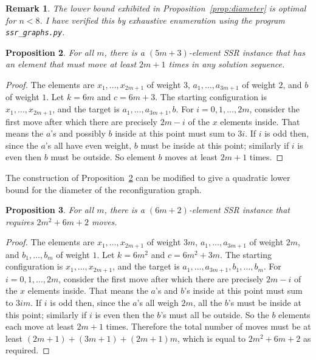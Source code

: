 \documentclass{robinminion}
\newtheorem{prop}{Proposition}
\newtheorem{rem}[prop]{Remark}
\begin{document}
\begin{rem}
    The lower bound exhibited in Proposition~\ref{prop:diameter} is optimal for $n<8$. I have verified this by exhaustive enumeration using the program \texttt{ssr\_graphs.py}.
\end{rem}

\begin{prop}\label{prop:element-moves-a-lot}
    For all $m$, there is a $(5m+3)$-element SSR instance that has an element that must move at least $2m+1$ times in any solution sequence.
\end{prop}
\begin{proof}
    The elements are $x_1, \dots, x_{2m+1}$ of weight $3$, $a_1, \dots, a_{3m+1}$ of weight $2$, and $b$ of weight $1$.
    Let $k=6m$ and $c=6m+3$. The starting configuration is $x_1, \dots, x_{2m+1}$, and the target is $a_1, \dots, a_{3m+1}, b$. For $i=0, 1, \dots, 2m$, consider the first move after which there are precisely $2m-i$ of the $x$ elements inside. That means the $a$'s and possibly $b$ inside at this point must sum to $3i$. If $i$ is odd then, since the $a$'s all have even weight, $b$ must be inside at this point; similarly if $i$ is even then $b$ must be outside. So element $b$ moves at least $2m+1$ times.
\end{proof}

\noindent The construction of Proposition~\ref{prop:element-moves-a-lot} can be modified to give a quadratic lower bound for the diameter of the reconfiguration graph.
\begin{prop}\label{prop:quadratic-bound}
    For all $m$, there is a $(6m+2)$-element SSR instance that requires $2m^2+6m+2$ moves.
\end{prop}
\begin{proof}
    The elements are
    $x_1, \dots, x_{2m+1}$ of weight $3m$,
    $a_1, \dots, a_{3m+1}$ of weight $2m$,
    and $b_1, \dots, b_m$ of weight $1$.
    Let $k=6m^2$ and $c=6m^2+3m$.
    The starting configuration is $x_1, \dots, x_{2m+1}$,
    and the target is $a_1, \dots, a_{3m+1}, b_1, \dots, b_m$.
    For $i=0, 1, \dots, 2m$, consider the first move after which there are precisely $2m-i$ of the $x$ elements inside. That means the $a$'s and $b$'s inside at this point must sum to $3im$. If $i$ is odd then, since the $a$'s all weigh $2m$, all the $b$'s must be inside at this point; similarly if $i$ is even then the $b$'s must all be outside. So the $b$ elements each move at least $2m+1$ times.
    Therefore the total number of moves must be at least $(2m+1) + (3m+1) + (2m+1)m$, which is equal to $2m^2+6m+2$ as required.
\end{proof}
\end{document}
